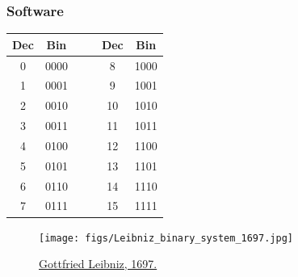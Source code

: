 \documentclass[aspectratio=169]{beamer}
\begin{document}
\begin{frame}[fragile]\frametitle{Software}

\begin{minipage}{5cm}
\begin{tabular}{c|c| c c |c|c}
Dec& Bin  & & & Dec& Bin\\ \hline
0	& 0000 & & & 8	& 1000 \\
1	& 0001 & & & 9	& 1001 \\
2	& 0010 & & & 10	& 1010 \\
3	& 0011 & & & 11	& 1011 \\
4	& 0100 & & & 12	& 1100 \\
5	& 0101 & & & 13	& 1101 \\
6	& 0110 & & & 14	& 1110 \\
7	& 0111 & & & 15	& 1111
\end{tabular}
\end{minipage}
\hfill
\begin{minipage}{5cm}
\begin{figure}
\texttt{[image: figs/Leibniz\_binary\_system\_1697.jpg]}
\caption{\href{https://es.wikipedia.org/wiki/Gottfried_Leibniz}{Gottfried Leibniz, 1697.}}
\end{figure}
\end{minipage}
\end{frame}
\end{document}
